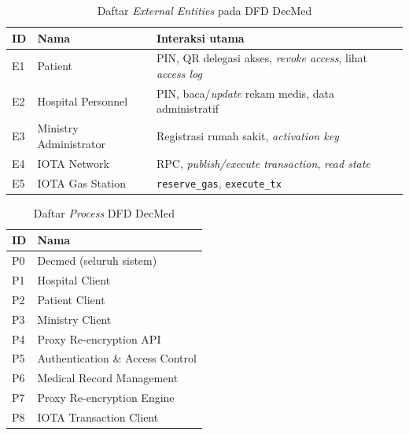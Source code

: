 \documentclass[bahasa, 12pt, a4paper, onecolumn, oneside, final]{report}
\begin{document}
\begin{table}[!ht]
	\centering
	\caption{Daftar \textit{External Entities} pada DFD DecMed}
	\label{tab:dfd-external-entities}
	\small
	\begin{tabular}{|p{}|p{}|p{}|}
		\hline
		\textbf{ID} & \textbf{Nama}          & \textbf{Interaksi utama}                                                  \\ \hline
		E1          & Patient                & PIN, QR delegasi akses, \textit{revoke access}, lihat \textit{access log} \\ \hline
		E2          & Hospital Personnel     & PIN, baca/\textit{update} rekam medis, data administratif                 \\ \hline
		E3          & Ministry Administrator & Registrasi rumah sakit, \textit{activation key}                           \\ \hline
		E4          & IOTA Network           & RPC, \textit{publish/execute transaction}, \textit{read state}            \\ \hline
		E5          & IOTA Gas Station       & \texttt{reserve\_gas}, \texttt{execute\_tx}                               \\ \hline
	\end{tabular}
\end{table}

\begin{table}[!ht]
	\centering
	\caption{Daftar \textit{Process} DFD DecMed}
	\label{tab:dfd-process}
	\small
	\begin{tabular}{|p{}|p{}|}
		\hline
		\textbf{ID} & \textbf{Nama}                    \\ \hline
		P0          & Decmed (seluruh sistem)          \\ \hline
		P1          & Hospital Client                  \\ \hline
		P2          & Patient Client                   \\ \hline
		P3          & Ministry Client                  \\ \hline
		P4          & Proxy Re-encryption API          \\ \hline
		P5          & Authentication \& Access Control \\ \hline
		P6          & Medical Record Management        \\ \hline
		P7          & Proxy Re-encryption Engine       \\ \hline
		P8          & IOTA Transaction Client          \\ \hline
	\end{tabular}
\end{table}
\end{document}
